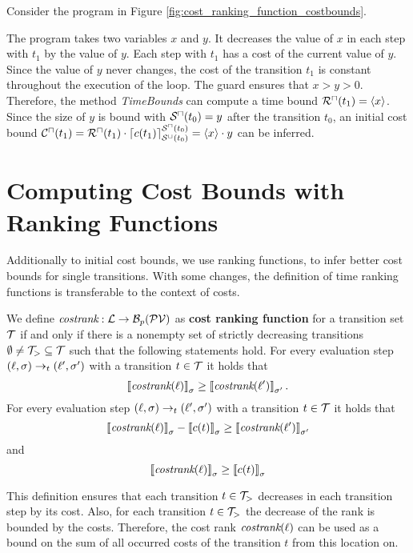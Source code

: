 \begin{example}
  Consider the program in Figure \ref{fig:cost_ranking_function_costbounds}.
  
  The program takes two variables $x$ and $y$.
  It decreases the value of $x$ in each step with $t_1$ by the value of $y$.
  Each step with $t_1$ has a cost of the current value of $y$.
  Since the value of $y$ never changes, the cost of the transition $t_1$ is constant throughout the execution of the loop.
  The guard ensures that $x > y > 0$.
  Therefore, the method \emph{TimeBounds} can compute a time bound ${\mathcal{R}^\sqcap}(t_1) = \left\langle x \right\rangle$.
  Since the size of $y$ is bound with ${\mathcal{S}^\sqcap}(t_0) = y$ after the transition $t_0$, an initial cost bound ${\mathcal{C}^\sqcap}(t_1) = {\mathcal{R}^\sqcap}(t_1) \cdot \left\lceil c(t_1) \right\rceil^{{\mathcal{S}^\sqcap}(t_0)}_{{\mathcal{S}^\sqcup}(t_0)} = \left\langle x \right\rangle \cdot y$ can be inferred.
\end{example}

\section{Computing Cost Bounds with Ranking Functions}

Additionally to initial cost bounds, we use ranking functions, to infer better cost bounds for single transitions.
With some changes, the definition of time ranking functions is transferable to the context of costs.

\begin{definition} 
  We define $\emph{costrank}: \mathcal{L} \rightarrow \mathcal{B}_p(\mathcal{PV})$ as \textbf{cost ranking function} for a transition set $\mathcal{T}$ if and only if there is a nonempty set of strictly decreasing transitions $\emptyset \neq \mathcal{T}_{>} \subseteq \mathcal{T}$ such that the following statements hold.
  For every evaluation step $(\ell, \sigma) \rightarrow_t (\ell', \sigma')$ with a transition $t \in \mathcal{T}$ it holds that
  \[ \left\llbracket \emph{costrank}(\ell) \right\rrbracket_{\sigma} \geq \left\llbracket \emph{costrank}(\ell') \right\rrbracket_{\sigma'}. \]
  For every evaluation step $(\ell, \sigma) \rightarrow_t (\ell', \sigma')$ with a transition $t \in \mathcal{T}$ it holds that        
  \[ \left\llbracket \emph{costrank}(\ell) \right\rrbracket_{\sigma} - \left\llbracket c(t) \right\rrbracket_{\sigma} \geq \left\llbracket \emph{costrank}(\ell') \right\rrbracket_{\sigma'} \]
  and
  \[ \left\llbracket \emph{costrank}(\ell) \right\rrbracket_{\sigma} \geq \left\llbracket c(t) \right\rrbracket_{\sigma} \]
\end{definition}

This definition ensures that each transition $t \in \mathcal{T}_>$ decreases in each transition step by its cost.
Also, for each transition $t \in \mathcal{T}_>$ the decrease of the rank is bounded by the costs.
Therefore, the cost rank $\emph{costrank}(\ell)$ can be used as a bound on the sum of all occurred costs of the transition $t$ from this location on.

